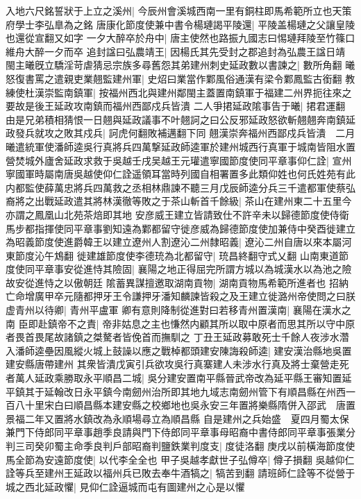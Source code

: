 入地六尺銘誓狀于上立之溪州|{
	今辰州會溪城西南一里有銅柱即馬希範所立也天策府學士李弘臯為之銘}
唐康化節度使兼中書令楊璉謁平陵還|{
	平陵盖楊璉之父讓皇陵也還從宣翻又如字}
一夕大醉卒於舟中|{
	唐主使然也路振九國志曰惕璉拜陵至竹篠口維舟大醉一夕而卒}
追封諡曰弘農靖王|{
	因楊氏其先受封之郡追封為弘農王諡日靖}
閩主曦旣立驕淫苛虐猜忌宗族多尋舊怨其弟建州刺史延政數以書諫之|{
	數所角翻}
曦怒復書罵之遣親吏業翹監建州軍|{
	史炤曰業當作鄴風俗通漢有梁令鄴鳳監古銜翻}
教練使杜漢崇監南鎮軍|{
	按福州西北與建州鄰閩主蓋置南鎮軍于福建二州界扼往來之要故是後王延政攻南鎮而福州西鄙戍兵皆潰}
二人爭捃延政隂事告于曦|{
	捃君運翻}
由是兄弟積相猜恨一日翹與延政議事不叶翹訶之曰公反邪延政怒欲斬翹翹奔南鎮延政發兵就攻之敗其戍兵|{
	訶虎何翻敗補邁翻下同}
翹漢崇奔福州西鄙戍兵皆潰　二月曦遣統軍使潘師逵吳行真將兵四萬撃延政師逵軍於建州城西行真軍于城南皆阻水置營焚城外廬舍延政求救于吳越壬戌吴越王元瓘遣寧國節度使同平章事仰仁詮|{
	宣州寧國軍時屬南唐吳越使仰仁詮遥領耳當時列國自相署置多此類仰姓也何氏姓苑有此}
内都監使薛萬忠將兵四萬救之丞相林鼎諫不聽三月戊辰師逵分兵三千遣都軍使蔡弘裔將之出戰延政遣其將林漢徹等敗之于茶山斬首千餘級|{
	茶山在建州東二十五里今亦謂之鳳凰山北苑茶焙即其地}
安彦威王建立皆請致仕不許辛未以歸德節度使侍衛馬步都指揮使同平章事劉知遠為鄴都留守徙彦威為歸德節度使加兼侍中癸酉徙建立為昭義節度使進爵韓王以建立遼州人割遼沁二州隸昭義|{
	遼沁二州自唐以來本屬河東節度沁午鴆翻}
徙建雄節度使李德珫為北都留守|{
	珫昌終翻守式乂翻}
山南東道節度使同平章事安從進恃其險固|{
	襄陽之地正得屈完所謂方城以為城漢水以為池之險故安從進恃之以傲朝廷}
隂蓄異謀擅邀取湖南貢物|{
	湖南貢物馬希範所進者也}
招納亡命增廣甲卒元隨都押牙王令謙押牙潘知麟諫皆殺之及王建立徙潞州帝使問之曰朕虚青州以待卿|{
	青州平盧軍}
卿有意則降制從進對曰若移青州置漢南|{
	襄陽在漢水之南}
臣即赴鎮帝不之責|{
	帝非姑息之主也慊然内顧其所以取中原者而思其所以守中原者畏首畏尾故諸鎮之桀驁者皆俛首而撫馴之}
丁丑王延政募敢死士千餘人夜涉水濳入潘師逵壘因風縱火城上鼓譟以應之戰棹都頭建安陳誨殺師逵|{
	建安漢治縣地吳置建安縣唐帶建州}
其衆皆潰戊寅引兵欲攻吳行真寨建人未涉水行真及將士棄營走死者萬人延政乘勝取永平順昌二城|{
	吳分建安置南平縣晉武帝改為延平縣王審知置延平鎮其于延翰改日永平鎮今南劒州治所即其地九域志南劒州管下有順昌縣在州西一百八十里宋白曰順昌縣本建安縣之校鄉地也吳永安三年置將樂縣隋併入邵武　唐置景福二年又置將水鎮改為永順場尋立為順昌縣}
自是建州之兵始盛　夏四月蜀太保兼門下侍郎同平章事趙季良請與門下侍郎同平章事母昭裔中書侍郎同平章事張業分判三司癸卯蜀主命季良判戶部昭裔判鹽鉄業判度支|{
	度徒洛翻}
庚戌以前橫海節度使馬全節為安遠節度使|{
	以代李全全也}
甲子吳越孝獻世子弘僔卒|{
	僔子損翻}
吳越仰仁詮等兵至建州王延政以福州兵已敗去奉牛酒犒之|{
	犒苦到翻}
請班師仁詮等不從營于城之西北延政懼|{
	見仰仁詮逼城而屯有圖建州之心是以懼}
